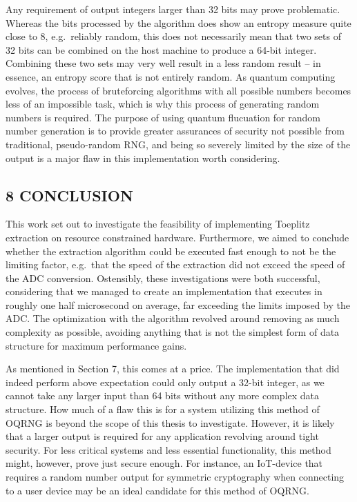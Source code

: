 \documentclass{sigchi}
\begin{document}
Any requirement of output integers larger than 32 bits may prove problematic. Whereas the bits processed by the algorithm does show an entropy measure quite close to 8, e.g.~reliably random, this does not necessarily mean that two sets of 32 bits can be combined on the host machine to produce a 64-bit integer. Combining these two sets may very well result in a less random result -- in essence, an entropy score that is not entirely random. As quantum computing evolves, the process of bruteforcing algorithms with all possible numbers becomes less of an impossible task, which is why this process of generating random numbers is required. The purpose of using quantum flucuation for random number generation is to provide greater assurances of security not possible from traditional, pseudo-random RNG, and being so severely limited by the size of the output is a major flaw in this implementation worth considering.

\subsection{8 CONCLUSION}\label{conclusion}

This work set out to investigate the feasibility of implementing Toeplitz extraction on resource constrained hardware. Furthermore, we aimed to conclude whether the extraction algorithm could be executed fast enough to not be the limiting factor, e.g.~that the speed of the extraction did not exceed the speed of the ADC conversion. Ostensibly, these investigations were both successful, considering that we managed to create an implementation that executes in roughly one half microsecond on average, far exceeding the limits imposed by the ADC. The optimization with the algorithm revolved around removing as much complexity as possible, avoiding anything that is not the simplest form of data structure for maximum performance gains.

As mentioned in Section 7, this comes at a price. The implementation that did indeed perform above expectation could only output a 32-bit integer, as we cannot take any larger input than 64 bits without any more complex data structure. How much of a flaw this is for a system utilizing this method of OQRNG is beyond the scope of this thesis to investigate. However, it is likely that a larger output is required for any application revolving around tight security. For less critical systems and less essential functionality, this method might, however, prove just secure enough. For instance, an IoT-device that requires a random number output for symmetric cryptography when connecting to a user device may be an ideal candidate for this method of OQRNG.
\end{document}
